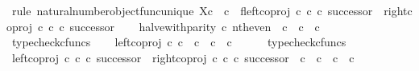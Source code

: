 \begin{isabellebody}
\isamarkupfalse%
\ {\isacharparenleft}{\kern0pt}rule\ natural{\isacharunderscore}{\kern0pt}number{\isacharunderscore}{\kern0pt}object{\isacharunderscore}{\kern0pt}func{\isacharunderscore}{\kern0pt}unique{\isacharbrackleft}{\kern0pt}\ X{\isacharequal}{\kern0pt}{\isachardoublequoteopen}{\isasymnat}\isactrlsub c\ {\isasymCoprod}\ {\isasymnat}\isactrlsub c{\isachardoublequoteclose}{\isacharcomma}{\kern0pt}\ \ f{\isacharequal}{\kern0pt}{\isachardoublequoteopen}{\isacharparenleft}{\kern0pt}left{\isacharunderscore}{\kern0pt}coproj\ {\isasymnat}\isactrlsub c\ {\isasymnat}\isactrlsub c\ {\isasymcirc}\isactrlsub c\ successor{\isacharparenright}{\kern0pt}\ {\isasymamalg}\ {\isacharparenleft}{\kern0pt}right{\isacharunderscore}{\kern0pt}coproj\ {\isasymnat}\isactrlsub c\ {\isasymnat}\isactrlsub c\ {\isasymcirc}\isactrlsub c\ successor{\isacharparenright}{\kern0pt}{\isachardoublequoteclose}{\isacharbrackright}{\kern0pt}{\isacharparenright}{\kern0pt}\isanewline
\ \ \isamarkupfalse%
\ {\isachardoublequoteopen}halve{\isacharunderscore}{\kern0pt}with{\isacharunderscore}{\kern0pt}parity\ {\isasymcirc}\isactrlsub c\ nth{\isacharunderscore}{\kern0pt}even\ {\isacharcolon}{\kern0pt}\ {\isasymnat}\isactrlsub c\ {\isasymrightarrow}\ {\isasymnat}\isactrlsub c\ {\isasymCoprod}\ {\isasymnat}\isactrlsub c{\isachardoublequoteclose}\isanewline
\ \ \ \ \isamarkupfalse%
\ typecheck{\isacharunderscore}{\kern0pt}cfuncs\isanewline
\ \ \isamarkupfalse%
\ {\isachardoublequoteopen}left{\isacharunderscore}{\kern0pt}coproj\ {\isasymnat}\isactrlsub c\ {\isasymnat}\isactrlsub c\ {\isacharcolon}{\kern0pt}\ {\isasymnat}\isactrlsub c\ {\isasymrightarrow}\ {\isasymnat}\isactrlsub c\ {\isasymCoprod}\ {\isasymnat}\isactrlsub c{\isachardoublequoteclose}\isanewline
\ \ \ \ \isamarkupfalse%
\ typecheck{\isacharunderscore}{\kern0pt}cfuncs\isanewline
\ \ \isamarkupfalse%
\ {\isachardoublequoteopen}{\isacharparenleft}{\kern0pt}left{\isacharunderscore}{\kern0pt}coproj\ {\isasymnat}\isactrlsub c\ {\isasymnat}\isactrlsub c\ {\isasymcirc}\isactrlsub c\ successor{\isacharparenright}{\kern0pt}\ {\isasymamalg}\ {\isacharparenleft}{\kern0pt}right{\isacharunderscore}{\kern0pt}coproj\ {\isasymnat}\isactrlsub c\ {\isasymnat}\isactrlsub c\ {\isasymcirc}\isactrlsub c\ successor{\isacharparenright}{\kern0pt}\ {\isacharcolon}{\kern0pt}\ {\isasymnat}\isactrlsub c\ {\isasymCoprod}\ {\isasymnat}\isactrlsub c\ {\isasymrightarrow}\ {\isasymnat}\isactrlsub c\ {\isasymCoprod}\ {\isasymnat}\isactrlsub c{\isachardoublequoteclose}\isanewline

\end{isabellebody}
